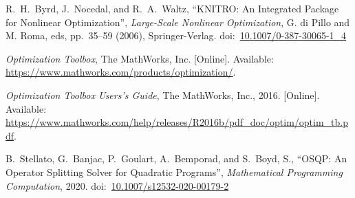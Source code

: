 \documentclass[12pt]{article}
\numberwithin{equation}{section}
\numberwithin{table}{section}
\numberwithin{figure}{section}
\begin{document}
\begin{thebibliography}{99}
R.~H.~Byrd, J.~Nocedal, and R.~A.~Waltz, ``KNITRO: An Integrated Package for Nonlinear Optimization'', \emph{Large-Scale Nonlinear Optimization}, G. di Pillo and M. Roma, eds, pp.~35--59 (2006), Springer-Verlag.
doi:~\href{https://doi.org/10.1007/0-387-30065-1_4}{10.1007/0-387-30065-1\_4}

\emph{Optimization Toolbox}, The MathWorks, Inc.
  [Online]. Available: \url{https://www.mathworks.com/products/optimization/}.

\emph{Optimization Toolbox Users's Guide}, The MathWorks, Inc., 2016.
  [Online]. Available: \url{https://www.mathworks.com/help/releases/R2016b/pdf_doc/optim/optim_tb.pdf}.

B.~Stellato, G.~Banjac, P.~Goulart, A.~Bemporad, and S.~Boyd, S., ``{OSQP}: An Operator Splitting Solver for Quadratic Programs'', \emph{Mathematical Programming Computation}, 2020.
doi:~\href{https://doi.org/10.1007/s12532-020-00179-2}{10.1007/s12532-020-00179-2}

\end{thebibliography}
\end{document}
